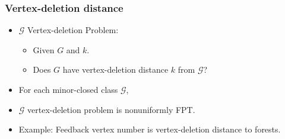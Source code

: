 \documentclass[t,usenames,dvipsnames]{beamer}
\begin{document}
\begin{frame}\frametitle{Vertex-deletion distance}
	\begin{itemize}[<+->]
		\item $\mathcal{G}$ Vertex-deletion Problem:
			\begin{itemize}
				\item Given $G$ and $k$.
				\item Does $G$ have vertex-deletion distance $k$ from $\mathcal{G}$?
			\end{itemize}
		\item For each minor-closed class $\mathcal{G}$, 
		\item[] \hspace{1cm} $\mathcal{G}$ vertex-deletion problem is nonuniformly FPT.
		\item Example: Feedback vertex number is vertex-deletion distance to forests.
	\end{itemize}
\end{frame}
\end{document}
